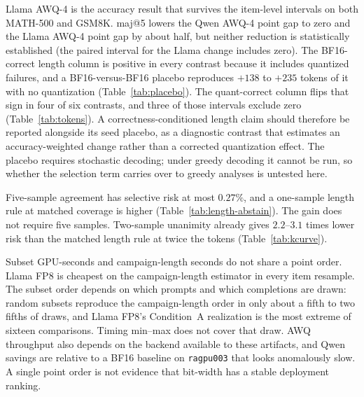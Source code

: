 \documentclass[11pt,a4paper]{article}
\begin{document}
Llama AWQ-4 is the accuracy result that survives the item-level intervals on both MATH-500 and GSM8K. maj@5 lowers the Qwen AWQ-4 point gap to zero and the Llama AWQ-4 point gap by about half, but neither reduction is statistically established (the paired interval for the Llama change includes zero). The BF16-correct length column is positive in every contrast because it includes quantized failures, and a BF16-versus-BF16 placebo reproduces $+138$ to $+235$ tokens of it with no quantization (Table~\ref{tab:placebo}). The quant-correct column flips that sign in four of six contrasts, and three of those intervals exclude zero (Table~\ref{tab:tokens}). A correctness-conditioned length claim should therefore be reported alongside its seed placebo, as a diagnostic contrast that estimates an accuracy-weighted change rather than a corrected quantization effect. The placebo requires stochastic decoding; under greedy decoding it cannot be run, so whether the selection term carries over to greedy analyses is untested here.

Five-sample agreement has selective risk at most $0.27\%$, and a one-sample length rule at matched coverage is higher (Table~\ref{tab:length-abstain}). The gain does not require five samples. Two-sample unanimity already gives $2.2$--$3.1$ times lower risk than the matched length rule at twice the tokens (Table~\ref{tab:kcurve}).

Subset GPU-seconds and campaign-length seconds do not share a point order. Llama FP8 is cheapest on the campaign-length estimator in every item resample. The subset order depends on which prompts and which completions are drawn: random subsets reproduce the campaign-length order in only about a fifth to two fifths of draws, and Llama FP8's Condition~A realization is the most extreme of sixteen comparisons. Timing min--max does not cover that draw. AWQ throughput also depends on the backend available to these artifacts, and Qwen savings are relative to a BF16 baseline on \texttt{ragpu003} that looks anomalously slow. A single point order is not evidence that bit-width has a stable deployment ranking.
\end{document}
